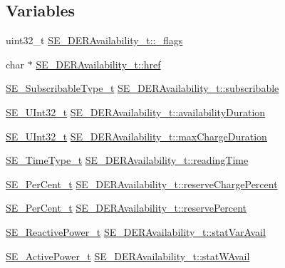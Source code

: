 \subsection*{Variables}
\begin{DoxyCompactItemize}
\item 
uint32\+\_\+t \hyperlink{group__DERAvailability_ga5184b891eb9243cbc337cb66f7afc5d3}{S\+E\+\_\+\+D\+E\+R\+Availability\+\_\+t\+::\+\_\+flags}
\item 
char $\ast$ \hyperlink{group__DERAvailability_ga5ae1c571d6750310abb6c25d2c1f9ec1}{S\+E\+\_\+\+D\+E\+R\+Availability\+\_\+t\+::href}
\item 
\hyperlink{group__SubscribableType_ga5c41f553d369710ed34619266bf2551e}{S\+E\+\_\+\+Subscribable\+Type\+\_\+t} \hyperlink{group__DERAvailability_gac57295f5506a2a4f18e4044cf783be4e}{S\+E\+\_\+\+D\+E\+R\+Availability\+\_\+t\+::subscribable}
\item 
\hyperlink{group__UInt32_ga70bd4ecda3c0c85d20779d685a270cdb}{S\+E\+\_\+\+U\+Int32\+\_\+t} \hyperlink{group__DERAvailability_gae081b220b89bb465c0654de559704c68}{S\+E\+\_\+\+D\+E\+R\+Availability\+\_\+t\+::availability\+Duration}
\item 
\hyperlink{group__UInt32_ga70bd4ecda3c0c85d20779d685a270cdb}{S\+E\+\_\+\+U\+Int32\+\_\+t} \hyperlink{group__DERAvailability_ga1bb60a9e730bcf975b7a925dc5875136}{S\+E\+\_\+\+D\+E\+R\+Availability\+\_\+t\+::max\+Charge\+Duration}
\item 
\hyperlink{group__TimeType_ga6fba87a5b57829b4ff3f0e7638156682}{S\+E\+\_\+\+Time\+Type\+\_\+t} \hyperlink{group__DERAvailability_gafd14159c0b528ff888f15c999908eee9}{S\+E\+\_\+\+D\+E\+R\+Availability\+\_\+t\+::reading\+Time}
\item 
\hyperlink{group__PerCent_ga14278cbee754c63496035b722b417ddc}{S\+E\+\_\+\+Per\+Cent\+\_\+t} \hyperlink{group__DERAvailability_ga1d323d90b7f839ca0c5c2fd243bf5a8e}{S\+E\+\_\+\+D\+E\+R\+Availability\+\_\+t\+::reserve\+Charge\+Percent}
\item 
\hyperlink{group__PerCent_ga14278cbee754c63496035b722b417ddc}{S\+E\+\_\+\+Per\+Cent\+\_\+t} \hyperlink{group__DERAvailability_ga186a342c1180f00c5b9ba0d8b74d41f3}{S\+E\+\_\+\+D\+E\+R\+Availability\+\_\+t\+::reserve\+Percent}
\item 
\hyperlink{structSE__ReactivePower__t}{S\+E\+\_\+\+Reactive\+Power\+\_\+t} \hyperlink{group__DERAvailability_ga71bc8d7e0861abe18b80c3f3850f472b}{S\+E\+\_\+\+D\+E\+R\+Availability\+\_\+t\+::stat\+Var\+Avail}
\item 
\hyperlink{structSE__ActivePower__t}{S\+E\+\_\+\+Active\+Power\+\_\+t} \hyperlink{group__DERAvailability_gafa87b4a21d462f0eff8fbebff012f8c1}{S\+E\+\_\+\+D\+E\+R\+Availability\+\_\+t\+::stat\+W\+Avail}
\end{DoxyCompactItemize}


